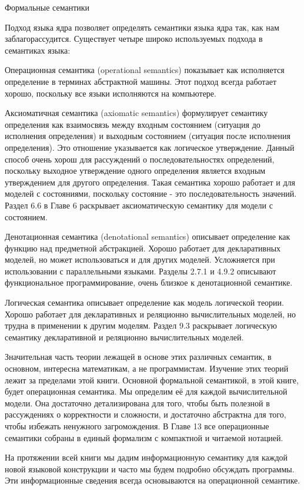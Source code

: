 Формальные семантики

Подход языка ядра позволяет определять семантики языка ядра так, как нам заблагорассудится. Существует четыре широко используемых подхода в семантиках языка:

Операционная семантика (operational semantics) показывает как исполняется определение в терминах абстрактной машины. Этот подход всегда работает хорошо, поскольку все языки исполняются на компьютере.

Аксиоматичная семантика (axiomatic semantics) формулирует семантику определения как взаимосвязь между входным состоянием (ситуация до исполнения определения) и выходным состоянием (ситуация после исполнения определения). Это отношение указывается как логическое утверждение. Данный способ очень хорош для рассуждений о последовательностях определений, поскольку выходное утверждение одного определения является входным утверждением для другого определения. Такая семантика хорошо работает и для моделей с состояниями, поскольку состояние - это последовательность значений. Раздел 6.6 в Главе 6 раскрывает аксиоматическую семантику для модели с состоянием.

Денотационная семантика (denotational semantics) описывает определение как функцию над предметной абстракцией. Хорошо работает для декларативных моделей, но может использоваться и для других моделей. Усложняется при использовании с параллельными языками. Разделы 2.7.1 и 4.9.2 описывают функциональное программирование, очень близкое к денотационной семантике.

Логическая семантика описывает определение как модель логической теории. Хорошо работает для декларативных и реляционно вычислительных моделей, но трудна в применении к другим моделям. Раздел 9.3 раскрывает логическую семантику декларативной и реляционно вычислительных моделей.

Значительная часть теории лежащей в основе этих различных семантик, в основном, интересна математикам, а не программистам. Изучение этих теорий лежит за пределами этой книги. Основной формальной семантикой, в этой книге, будет операционная семантика. Мы определим её для каждой вычислительной модели. Она достаточно детализирована для того, чтобы быть полезной в рассуждениях о корректности и сложности, и достаточно абстрактна для того, чтобы избежать ненужного загромождения. В Главе 13 все операционные семантики собраны в единый формализм с компактной и читаемой нотацией.

На протяжении всей книги мы дадим информационную семантику для каждой новой языковой конструкции и часто мы будем подробно обсуждать программы. Эти информационные сведения всегда основываются на операционной семантике.


